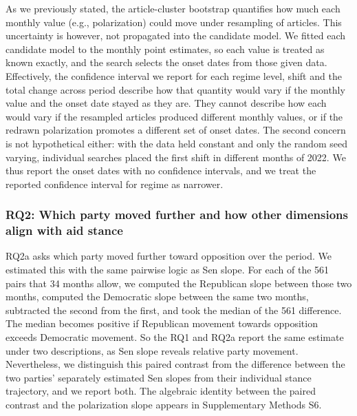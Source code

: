 As we previously stated, the article-cluster bootstrap quantifies how much each monthly value (e.g., polarization) could move under resampling of articles. This uncertainty is however, not propagated into the candidate model. We fitted each candidate model to the monthly point estimates, so each value is treated as known exactly, and the search selects the onset dates from those given data. Effectively, the confidence interval we report for each regime level, shift and the total change across period describe how that quantity would vary if the monthly value and the onset date stayed as they are. They cannot describe how each would vary if the resampled articles produced different monthly values, or if the redrawn polarization promotes a different set of onset dates. The second concern is not hypothetical either: with the data held constant and only the random seed varying, individual searches placed the first shift in different months of 2022. We thus report the onset dates with no confidence intervals, and we treat the reported confidence interval for regime as narrower.

\subsubsection{RQ2: Which party moved further and how other dimensions align with aid stance}

RQ2a asks which party moved further toward opposition over the period. We estimated this with the same pairwise logic as Sen slope. For each of the 561 pairs that 34 months allow, we computed the Republican slope between those two months, computed the Democratic slope between the same two months, subtracted the second from the first, and took the median of the 561 difference. The median becomes positive if Republican movement towards opposition exceeds Democratic movement. So the RQ1 and RQ2a report the same estimate under two descriptions, as Sen slope reveals relative party movement. Nevertheless, we distinguish this paired contrast from the difference between the two parties' separately estimated Sen slopes from their individual stance trajectory, and we report both. The algebraic identity between the paired contrast and the polarization slope appears in Supplementary Methods S6.

